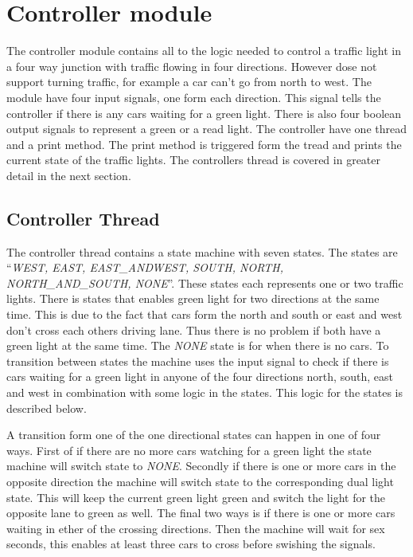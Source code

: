 \section{Controller module}
The controller module contains all to the logic needed to control a traffic light in a four way junction with traffic flowing in four directions. However dose not support turning traffic, for example a car can't go from north to west. The module have four input signals, one form each direction. This signal tells the controller if there is any cars waiting for a green light. There is also four boolean output signals to represent a green or a read light. The controller have one thread and a print method. The print method is triggered form the tread and prints the current state of the traffic lights. The controllers thread is covered in greater detail in the next section. 



\subsection{Controller Thread}
The controller thread contains a state machine with seven states. The states are ``\emph{WEST, EAST, EAST{\_}AND{\N}WEST, SOUTH, NORTH, NORTH{\_}AND{\_}SOUTH, NONE}''. These states each represents one or two traffic lights. There is states that enables green light for two directions at the same time. This is due to the fact that cars form the north and south or east and west don't cross each others driving lane. Thus there is no problem if both have a green light at the same time. The \emph{NONE} state is for when there is no cars. To transition between states the machine uses the input signal to check if there is cars waiting for a green light in anyone of the four directions north, south, east and west in combination with some logic in the states. This logic for the states is described below. 

A transition form one of the one directional states can happen in one of four ways. First of if there are no more cars watching for a green light the state machine will switch state to \emph{NONE}. Secondly if there is one or more cars in the opposite direction the machine will switch state to the corresponding dual light state. This will keep the current green light green and switch the light for the opposite lane to green as well. The final two ways is if there is one or more cars waiting in ether of the crossing directions. Then the machine will wait for sex seconds, this enables at least three cars to cross before swishing the signals.

